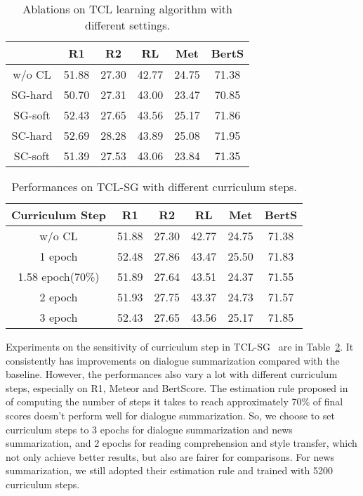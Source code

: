 \begin{table}[th]
	\scriptsize
	\centering
	\begin{tabular}{cccccc}
		\hline
		{} & {R1} & {R2} & {RL} & {Met} & {BertS} \\
		\hline
		w/o CL& 51.88 & 27.30 & 42.77 & 24.75 & 71.38 \\
		\hline
		SG-hard &50.70 & 27.31 & 43.00 & 23.47 & 70.85\\
		SG-soft & 52.43 & 27.65 & 43.56 & 25.17 & 71.86 \\
		\hline
		SC-hard &  52.69 & 28.28 & 43.89 & 25.08 & 71.95 \\
		SC-soft & 51.39 & 27.53 & 43.06 & 23.84 & 71.35 \\
		\hline
	\end{tabular}
	\caption{Ablations on TCL learning algorithm with different settings.}
	\label{tab:tclpre}
\end{table} 
\begin{table}[th]
	\scriptsize
	\centering
	\begin{tabular}{cccccc}
		\hline
		{Curriculum Step} & {R1} & {R2} & {RL} & {Met} & {BertS} \\
		\hline
		w/o CL & 51.88 & 27.30 & 42.77 & 24.75 & 71.38 \\
		\hline
		1 epoch & 52.48 & 27.86 & 43.47 & 25.50 &71.83 \\
		1.58 epoch(70\%) & 51.89 & 27.64 & 43.51 & 24.37 &71.55 \\
		2 epoch & 51.93 & 27.75 & 43.37 & 24.73 & 71.57\\
		3 epoch & 52.43 & 27.65 & 43.56 & 25.17 & 71.85\\
		\hline
	\end{tabular}
	\caption{Performances on TCL-SG with different curriculum steps.}
	\label{tab:tclpre2}
\end{table}
Experiments on the sensitivity of curriculum step in TCL-SG~\cite{liang-etal-2021-token-wise} are in Table~\ref{tab:tclpre2}. 
It consistently has improvements on dialogue summarization compared with the baseline. However, the performances also vary a lot with different curriculum steps, especially on R1, Meteor and BertScore. The estimation rule proposed in~\citet{liang-etal-2021-token-wise} of computing the number of steps it takes to reach approximately 70\% of final scores doesn't perform well for dialogue summarization. So, we choose to set curriculum steps to 3 epochs for dialogue summarization and news summarization, and 2 epochs for reading comprehension and style transfer, which not only achieve better results, but also are fairer for comparisons. For news summarization, we still adopted their estimation rule and trained with 5200 curriculum steps.





